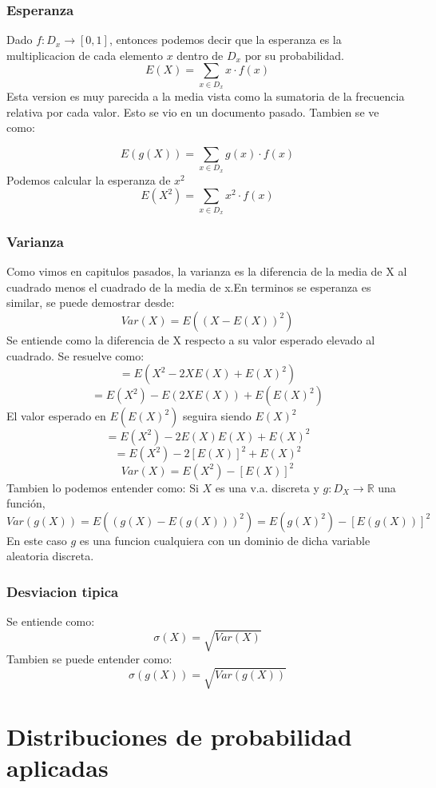 \documentclass[
]{article}
\begin{document}
\hypertarget{esperanza}{%
\subsubsection{Esperanza}\label{esperanza}}

Dado \(f: D_x\longrightarrow[0,1]\), entonces podemos decir que la
esperanza es la multiplicacion de cada elemento \(x\) dentro de \(D_x\)
por su probabilidad. \[E(X)=\sum_{x\in D_x}x \cdot f(x) \] Esta version
es muy parecida a la media vista como la sumatoria de la frecuencia
relativa por cada valor. Esto se vio en un documento pasado. Tambien se
ve como:

\[E(g(X))=\sum_{x\in D_x}g(x) \cdot f(x) \] Podemos calcular la
esperanza de \(x^2\) \[E(X^2)=\sum_{x\in D_x}x^2 \cdot f(x) \]

\hypertarget{varianza}{%
\subsubsection{Varianza}\label{varianza}}

Como vimos en capitulos pasados, la varianza es la diferencia de la
media de X al cuadrado menos el cuadrado de la media de x.En terminos se
esperanza es similar, se puede demostrar desde: \[Var(X)=E((X-E(X))^2)\]
Se entiende como la diferencia de X respecto a su valor esperado elevado
al cuadrado. Se resuelve como: \[=E(X^2-2XE(X)+E(X)^2)\]
\[=E(X^2)-E(2XE(X))+E(E(X)^2)\] El valor esperado en \(E(E(X)^2)\)
seguira siendo \(E(X)^2\) \[=E(X^2)-2E(X)E(X)+E(X)^2\]
\[=E(X^2)-2[E(X)]^2+E(X)^2\] \[Var(X)=E(X^2)-[E(X)]^2\] Tambien lo
podemos entender como: Si \(X\) es una v.a. discreta y
\(g:D_X\longrightarrow \mathbb{R}\) una función,
\[Var(g(X))=E((g(X)-E(g(X)))^2)=E(g(X)^2)-[E(g(X))]^2\] En este caso
\(g\) es una funcion cualquiera con un dominio de dicha variable
aleatoria discreta.

\hypertarget{desviacion-tipica}{%
\subsubsection{Desviacion tipica}\label{desviacion-tipica}}

Se entiende como: \[\sigma(X)=\sqrt{Var(X)}\] Tambien se puede entender
como: \[\sigma(g(X))=\sqrt{Var(g(X))}\]

\hypertarget{distribuciones-de-probabilidad-aplicadas}{%
\section{Distribuciones de probabilidad
aplicadas}\label{distribuciones-de-probabilidad-aplicadas}}
\end{document}

